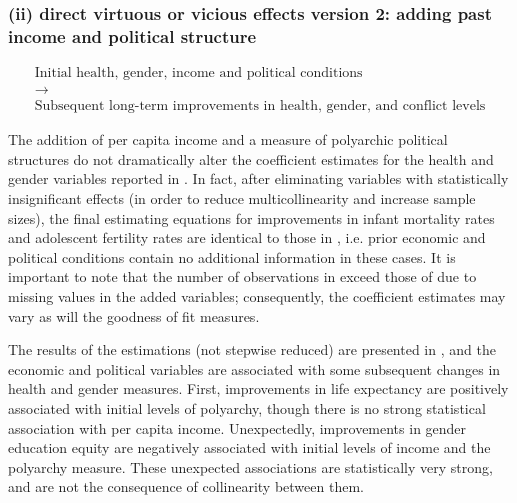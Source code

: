 \documentclass[12pt]{article}
\begin{document}
\subsubsection*{(ii) direct virtuous or vicious effects version 2: adding past income and political structure}

\begin{equation*}\begin{gathered}
\text{Initial health, gender, income and political conditions} \\
\longrightarrow \\
\text{Subsequent long-term improvements in health, gender, and conflict levels}
\end{gathered}\end{equation*}
\bigskip

The addition of per capita income and a measure of polyarchic political structures do not dramatically alter the coefficient estimates for the health and gender variables reported in . In fact, after eliminating variables with statistically insignificant effects (in order to reduce multicollinearity and increase sample sizes), the final estimating equations for improvements in infant mortality rates and adolescent fertility rates are identical to those in , i.e. prior economic and political conditions contain no additional information in these cases.  It is important to note that the number of observations in  exceed those of  due to missing values in the added variables; consequently, the coefficient estimates may vary as will the goodness of fit measures.



The results of the estimations (not stepwise reduced) are presented in , and the economic and political variables are associated with some subsequent changes in health and gender measures. First, improvements in life expectancy are positively associated with initial levels of polyarchy, though there is no strong statistical association with per capita income. Unexpectedly, improvements in gender education equity are negatively associated with initial levels of income and the polyarchy measure. These unexpected associations are statistically very strong, and are not the consequence of collinearity between them.
\end{document}

